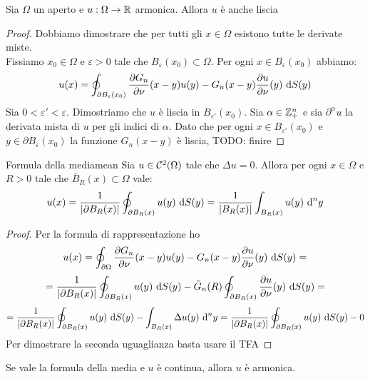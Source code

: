 \documentclass{article}
\begin{document}
\begin{theorem}{}{}
    Sia $\Omega$ un aperto e $u:\Omega \to \mathbb{R}$ armonica. Allora $u$ è anche liscia
\end{theorem}
\begin{proof}
    Dobbiamo dimostrare che per tutti gli $x\in\Omega$ esistono tutte le derivate miste.\\
    Fissiamo $x_0 \in \Omega $ e $\varepsilon>0$ tale che $B_\varepsilon(x_0)\subset\Omega$. Per ogni $x \in B_\varepsilon(x_0)$ abbiamo:
    \[u(x) = \oint_{\partial B_\varepsilon(x_0)} \frac{\partial G_n}{\partial \nu}(x-y) u(y) - G_n(x-y)\frac{\partial u}{\partial \nu}(y) \text{ d} S(y)\]
    Sia $0<\varepsilon' < \varepsilon$. Dimostriamo che $u$ è liscia in $B_{\varepsilon'}(x_0)$.
    Sia $\alpha \in \mathbb{Z}_+^n$ e sia $\partial^\alpha u$ la derivata mista di $u$ per gli indici di $\alpha$. Dato che per ogni $x \in B_{\varepsilon'}(x_0)$ e $y \in \partial B_\varepsilon(x_0)$ la funzione $G_n(x-y)$ è liscia, 
    TODO: finire
\end{proof}

\begin{theorem}{Formula della media}{mean}
    Sia $u \in \mathcal{C}^2(\Omega)$ tale che $\Delta u = 0$. Allora per ogni $x \in \Omega$ e $R>0$ tale che $\bar{B}_R(x)\subset \Omega$ vale:
    \[u(x) = \frac{1}{|\partial B_R(x)|}\oint_{\partial B_R(x)}u(y) \text{ d} S(y) = \frac{1}{| B_R(x)|}\int_{B_R(x)}u(y)\text{ d}^n y\] 
\end{theorem}
\begin{proof}
    Per la formula di rappresentazione ho
    \[u(x) = \oint_{\partial\Omega} \frac{\partial G_n}{\partial \nu}(x-y) u(y) - G_n(x-y)\frac{\partial u}{\partial \nu}(y) \text{ d} S(y) =\]
    \[= \frac{1}{|\partial B_R(x)|}\oint_{\partial B_R(x)}u(y) \text{ d} S(y) - \tilde{G}_n(R) \oint_{\partial B_R(x)} \frac{\partial u}{\partial \nu}(y) \text{ d} S(y) =\]\[= \frac{1}{|\partial B_R(x)|}\oint_{\partial B_R(x)}u(y) \text{ d} S(y) - \int_{B_R(x)} \Delta u (y)\text{ d}^n y = \frac{1}{|\partial B_R(x)|}\oint_{\partial B_R(x)}u(y) \text{ d} S(y) - 0\]
    Per dimostrare la seconda uguaglianza basta usare il TFA
\end{proof}
\begin{remark}{}{}
    Se vale la formula della media e $u$ è continua, allora $u$ è armonica.
\end{remark}
\end{document}
